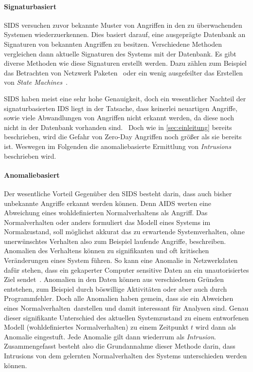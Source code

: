             \paragraph{Signaturbasiert} 
                \ac{SIDS} versuchen zuvor bekannte Muster von Angriffen 
                in den zu überwachenden Systemen wiederzuerkennen.
                Dies basiert darauf, eine ausgeprägte Datenbank an Signaturen von bekannten Angriffen zu besitzen.
                Verschiedene Methoden vergleichen dann aktuelle Signaturen des Systems mit der Datenbank.
                Es gibt diverse Methoden wie diese Signaturen erstellt werden. 
                Dazu zählen zum Beispiel das Betrachten von Netzwerk Paketen~\cite{IDSsurvey}
                oder ein wenig ausgefeilter das Erstellen von \textit{State Machines}~\cite{SIDSstate}.

                \ac{SIDS} haben meist eine sehr hohe Genauigkeit, doch ein wesentlicher Nachteil der signaturbasierten IDS liegt in der Tatsache,
                dass keinerlei neuartigen Angriffe, sowie viele Abwandlungen von Angriffen nicht erkannt werden,
                da diese noch nicht in der Datenbank vorhanden sind.~\cite{IDSsurvey}
                Doch wie in \autoref{sec:einleitung} bereits beschrieben, wird die Gefahr von Zero-Day Angriffen noch größer als sie bereits ist.
                Weswegen im Folgenden die anomaliebasierte Ermittlung von \textit{Intrusions} beschrieben wird.

            \paragraph{Anomaliebasiert}
                Der wesentliche Vorteil Gegenüber den \ac{SIDS} besteht darin, dass auch bisher unbekannte Angriffe erkannt werden können.
                Denn \ac{AIDS} werten eine Abweichung eines wohldefinierten Normalverhaltens als Angriff.
                Das Normalverhalten oder anders formuliert das Modell eines Systems im Normalzustand, soll möglichst akkurat das zu erwartende Systemverhalten, ohne unerwünschtes Verhalten also zum Beispiel laufende Angriffe, beschreiben.
                Anomalien des Verhaltens können zu signifikanten und oft kritischen Veränderungen eines System führen. 
                So kann eine Anomalie in Netzwerkdaten dafür stehen, dass ein gekaperter Computer sensitive Daten an ein unautorisiertes Ziel sendet~\cite{ANOMALYEXAMPLE}.
                Anomalien in den Daten können aus verschiedenen Gründen entstehen, zum Beispiel durch böswillige Aktivitäten oder aber auch durch Programmfehler.
                Doch alle Anomalien haben gemein, dass sie ein Abweichen eines \glqq Normalverhalten\grqq\ darstellen und damit interessant für Analysen sind.
                Genau dieser signifikante Unterschied des aktuellen Systemzustand zu einem entworfenen Modell (wohldefiniertes Normalverhalten) zu einem Zeitpunkt $t$ wird dann als Anomalie eingestuft.
                Jede Anomalie gilt dann wiederrum als \textit{Intrusion}.
                Zusammengefasst besteht also die Grundannahme dieser Methode darin, dass Intrusions von dem gelernten Normalverhalten des Systems unterschieden werden können.


